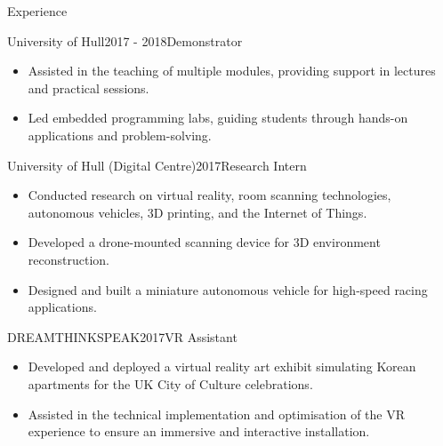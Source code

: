 \documentclass{cv}
\begin{document}
\begin{rSection}{Experience}
        \item \begin{rSubsection}{University of Hull}{2017 - 2018}{Demonstrator}{}
            \item \begin{itemize}
                \item Assisted in the teaching of multiple modules, providing support in lectures and practical sessions.
                \item Led embedded programming labs, guiding students through hands-on applications and problem-solving.
            \end{itemize}
        \end{rSubsection}
        
        \item \begin{rSubsection}{University of Hull (Digital Centre)}{2017}{Research Intern}{}
            \item \begin{itemize}
                \item Conducted research on virtual reality, room scanning technologies, autonomous vehicles, 3D printing, and the Internet of Things.
                \item Developed a drone-mounted scanning device for 3D environment reconstruction.
                \item Designed and built a miniature autonomous vehicle for high-speed racing applications.
            \end{itemize}
        \end{rSubsection}
        
        \item \begin{rSubsection}{DREAMTHINKSPEAK}{2017}{VR Assistant}{}
            \item \begin{itemize}
                \item Developed and deployed a virtual reality art exhibit simulating Korean apartments for the UK City of Culture celebrations.
                \item Assisted in the technical implementation and optimisation of the VR experience to ensure an immersive and interactive installation.
            \end{itemize}
        \end{rSubsection}
    \end{rSection}
    
\end{document}
